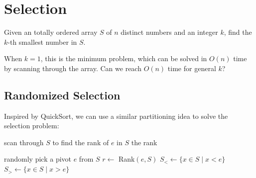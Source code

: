 \chapter{Selection}

\begin{question}
  Given an totally ordered array $S$ of $n$ distinct numbers and an integer $k$, find the $k$-th smallest number in $S$.
\end{question}

When $k = 1$, this is the minimum problem, which can be solved in $O(n)$ time by scanning through the array. Can we reach $O(n)$ time for general $k$?

\section{Randomized Selection}

Inspired by QuickSort, we can use a similar partitioning idea to solve the selection problem:

\begin{algorithm}[H]
  \caption{Rank$(e,S)$}
  scan through $S$ to find the rank of $e$ in $S$\;
  \Return the rank\;
\end{algorithm}

\begin{algorithm}[H]
  \caption{QuickSelect$(k,S)$}
  randomly pick a pivot $e$ from $S$\;
  $r \gets$ Rank$(e,S)$\;
  $S_<\gets \{x \in S \mid x < e\}$\;
  $S_>\gets \{x \in S \mid x > e\}$\;
\end{algorithm}

